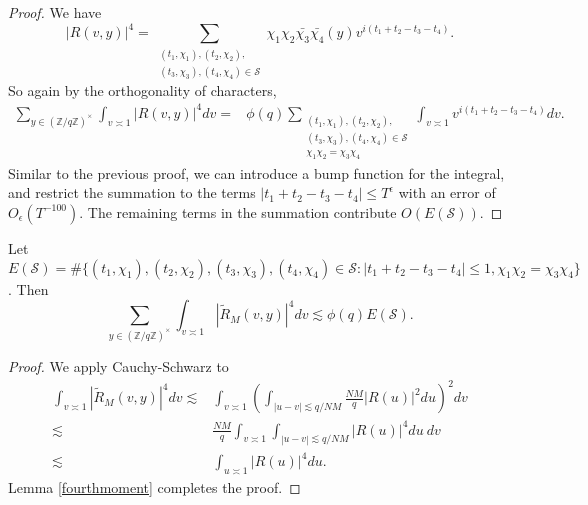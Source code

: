 \begin{proof}
    We have \[
    |R(v,y)|^4 = \sum_{\substack{(t_1,\chi_1),(t_2,\chi_2),\\ (t_3,\chi_3),(t_4,\chi_4)\in \mathcal{S}}}
    \chi_1{\chi}_2\bar{\chi_3}\bar{\chi_4}(y)v^{i(t_1+t_2-t_3-t_4)}.
    \]
    So again by the orthogonality of characters, \begin{align*}
        \sum_{y\in (\mathbb{Z}/q\mathbb{Z})^\times} \int_{v\asymp 1} 
        \left|R\left(v,y\right)\right|^4dv = & \phi(q)
        \sum_{\substack{(t_1,\chi_1),(t_2,\chi_2),\\ (t_3,\chi_3),(t_4,\chi_4)\in \mathcal{S}\\ \chi_1\chi_2=\chi_3\chi_4}} \int_{v\asymp 1} v^{i(t_1+t_2-t_3-t_4)} dv.
    \end{align*}
    Similar to the previous proof, we can introduce a bump function for the integral, and restrict the summation to the terms $|t_1+t_2-t_3-t_4|\leq T^\epsilon$ with an error of $O_\epsilon(T^{-100})$. The remaining terms in the summation contribute $O(E(\mathcal{S}))$.
\end{proof}
\begin{lemma}\label{fourthmoment_smooth}
    Let $E(\mathcal{S})=\#\{(t_1,\chi_1),(t_2,\chi_2),(t_3,\chi_3),(t_4,\chi_4)\in \mathcal{S}  :  |t_1+t_2-t_3-t_4|\leq 1, \chi_1\chi_2=\chi_3\chi_4\}$. Then \[
        \sum_{y\in (\mathbb{Z}/q\mathbb{Z})^\times} \int_{v\asymp 1} 
        \left|\tilde{R}_M\left(v,y\right)\right|^4dv  \lesssim \phi(q)E(\mathcal{S}).
    \]
\end{lemma}
\begin{proof}
    We apply Cauchy-Schwarz to \begin{align*}
        \int_{v\asymp 1} 
        \left|\tilde{R}_M\left(v,y\right)\right|^4dv  \lesssim& \int_{v\asymp 1} 
        \left(\int_{|u-v|\lesssim q/NM}
        \frac{NM}{q}|R(u)|^2 du\right)^2
        dv \\
        \lesssim& \frac{NM}{q} \int_{v\asymp 1} 
       \int_{|u-v|\lesssim q/NM}
        |R(u)|^4 du \ 
        dv\\
        \lesssim&  
        \int_{u\asymp 1}
         |R(u)|^4 du.
    \end{align*}
    Lemma \ref{fourthmoment} completes the proof.
\end{proof}
